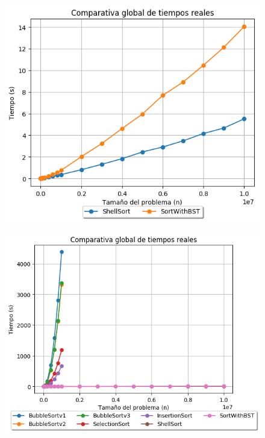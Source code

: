 \documentclass[12pt, fleqn]{report}                             %
\theoremstyle{break}                                            %
\begin{document}
    	        \begin{figure}[H]
    	            \centering
    	            \includegraphics[scale=0.78]{graphics/globalComparativeTimes3.png}
    	        \end{figure}
    	        
    	        \begin{figure}[H]
    	            \centering
    	            \includegraphics[scale=0.9]{graphics/globalComparativeTimes1.png}
    	        \end{figure}
    	        
\end{document}
